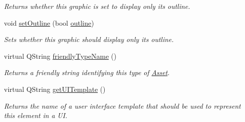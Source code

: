 \begin{DoxyCompactItemize}
\begin{DoxyCompactList}\small\item\em Returns whether this graphic is set to display only its outline. \end{DoxyCompactList}\item 
\hypertarget{class_picto_1_1_box_graphic_ac6b8b31b0854c799dac157c71125308b}{void \hyperlink{class_picto_1_1_box_graphic_ac6b8b31b0854c799dac157c71125308b}{set\-Outline} (bool \hyperlink{class_picto_1_1_box_graphic_a7c3cd6c20925e294df01c40c6a798518}{outline})}\label{class_picto_1_1_box_graphic_ac6b8b31b0854c799dac157c71125308b}

\begin{DoxyCompactList}\small\item\em Sets whether this graphic should display only its outline. \end{DoxyCompactList}\item 
virtual Q\-String \hyperlink{class_picto_1_1_box_graphic_a3e15fbb0ef4250c4f35902b0268f247b}{friendly\-Type\-Name} ()
\begin{DoxyCompactList}\small\item\em Returns a friendly string identifying this type of \hyperlink{class_picto_1_1_asset}{Asset}. \end{DoxyCompactList}\item 
\hypertarget{class_picto_1_1_box_graphic_a1fbec541b4f67390e056204c18ee46aa}{virtual Q\-String \hyperlink{class_picto_1_1_box_graphic_a1fbec541b4f67390e056204c18ee46aa}{get\-U\-I\-Template} ()}\label{class_picto_1_1_box_graphic_a1fbec541b4f67390e056204c18ee46aa}

\begin{DoxyCompactList}\small\item\em Returns the name of a user interface template that should be used to represent this element in a U\-I. \end{DoxyCompactList}\end{DoxyCompactItemize}
